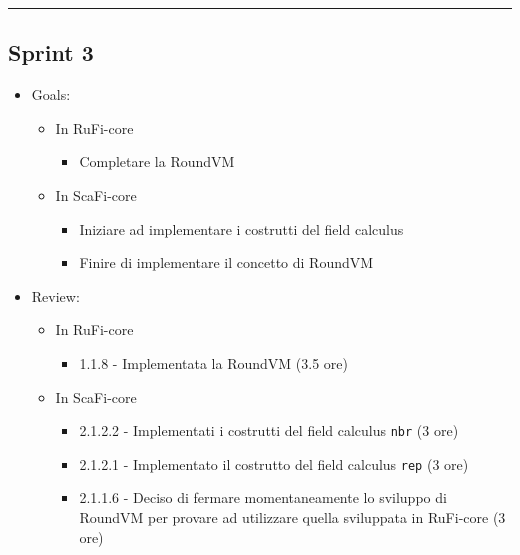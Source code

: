 \documentclass[12pt, a4paper]{article}
\begin{document}
\par\noindent\rule{\textwidth}{0.5pt}

\subsection*{Sprint 3}

\begin{itemize}
    \item Goals:
          \begin{itemize}
              \color{teal}
              \item In RuFi-core
                    \begin{itemize}
                        \item Completare la RoundVM
                    \end{itemize}
                    \color{cyan}
              \item In ScaFi-core
                    \begin{itemize}
                        \item Iniziare ad implementare i costrutti del field calculus
                        \item Finire di implementare il concetto di RoundVM
                    \end{itemize}
          \end{itemize}
    \item Review:
          \begin{itemize}
              \color{teal}
              \item In RuFi-core
                    \begin{itemize}
                        \item 1.1.8 - Implementata la RoundVM (3.5 ore)
                    \end{itemize}
                    \color{cyan}
              \item In ScaFi-core
                    \begin{itemize}
                        \item 2.1.2.2 - Implementati i costrutti del field calculus \texttt{nbr} (3 ore)
                        \item 2.1.2.1 - Implementato il costrutto del field calculus \texttt{rep} (3 ore)
                        \item 2.1.1.6 - Deciso di fermare momentaneamente lo sviluppo di RoundVM per provare ad utilizzare quella sviluppata in RuFi-core (3 ore)
                    \end{itemize}
          \end{itemize}
\end{itemize}
\end{document}
